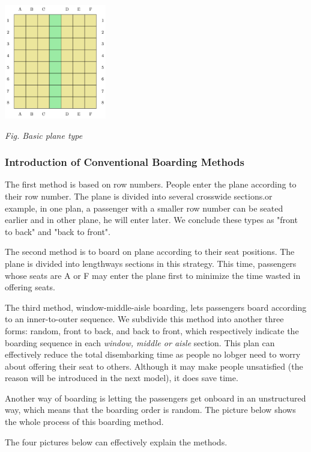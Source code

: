 \documentclass{article}
\begin{document}
	\begin{center}
		\includegraphics[height=5cm]{planeempty.jpg}

		\small \textit{Fig. Basic plane type}
	\end{center}

	\subsubsection{Introduction of Conventional Boarding Methods}
	The first method is based on row numbers. People enter the plane according to their row number. The plane is divided into several crosswide sections.or example, in one plan, a passenger with a smaller row number can be seated earlier and in other plane, he will enter later. We conclude these types as "front to back" and "back to front".

	The second method is to board on plane according to their seat positions. The plane is divided into lengthways sections in this strategy. This time, passengers whose seats are A or F may enter the plane first to minimize the time wasted in offering seats.

	The third method, window-middle-aisle boarding, lets passengers board according to an inner-to-outer sequence. We subdivide this method into another three forms: random, front to back, and back to front, which respectively indicate the boarding sequence in each \textit{window, middle or aisle} section. This plan can effectively reduce the total disembarking time as people no lobger need to worry about offering their seat to others. Although it may make people unsatisfied (the reason will be introduced in the next model), it does save time.

	Another way of boarding is letting the passengers get onboard in an unstructured way, which means that the boarding order is random. The picture below shows the whole process of this boarding method.

	The four pictures below can effectively explain the methods.
\end{document}
